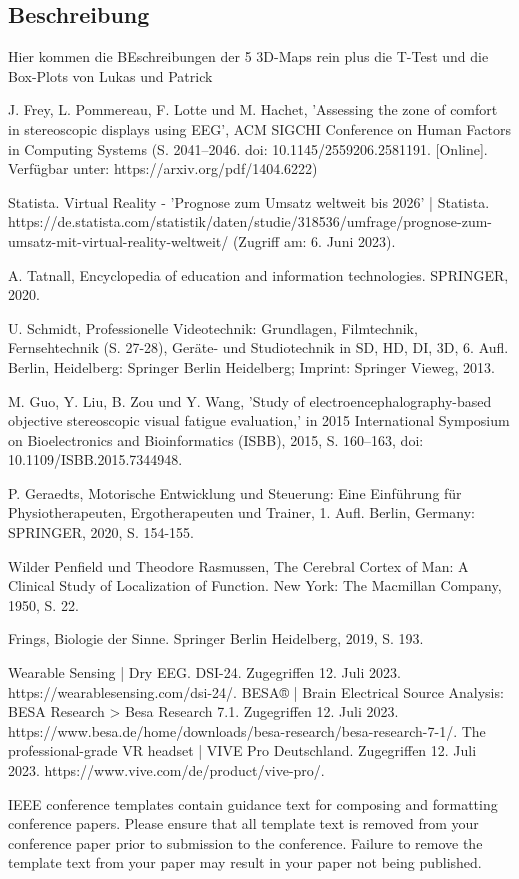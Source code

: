 \documentclass[conference]{IEEEtran}
\begin{document}
\subsection{Beschreibung}
Hier kommen die BEschreibungen der 5 3D-Maps rein plus die T-Test und die Box-Plots von Lukas und Patrick

\begin{thebibliography}{00}
 J. Frey, L. Pommereau, F. Lotte und M. Hachet, 'Assessing the zone of comfort in stereoscopic displays using EEG', ACM SIGCHI Conference on Human Factors in Computing Systems (S. 2041–2046. doi: 10.1145/2559206.2581191. [Online]. Verfügbar unter: https://arxiv.org/pdf/1404.6222)

 Statista. Virtual Reality - 'Prognose zum Umsatz weltweit bis 2026' | Statista. https://de.statista.com/statistik/daten/studie/318536/umfrage/prognose-zum-umsatz-mit-virtual-reality-weltweit/ (Zugriff am: 6. Juni 2023).

 A. Tatnall, Encyclopedia of education and information technologies. SPRINGER, 2020.

 U. Schmidt, Professionelle Videotechnik: Grundlagen, Filmtechnik, Fernsehtechnik (S. 27-28), Geräte- und Studiotechnik in SD, HD, DI, 3D, 6. Aufl. Berlin, Heidelberg: Springer Berlin Heidelberg; Imprint: Springer Vieweg, 2013.

 M. Guo, Y. Liu, B. Zou und Y. Wang, 'Study of electroencephalography-based objective stereoscopic visual fatigue evaluation,' in 2015 International Symposium on Bioelectronics and Bioinformatics (ISBB), 2015, S. 160–163, doi: 10.1109/ISBB.2015.7344948.

 P. Geraedts, Motorische Entwicklung und Steuerung: Eine Einführung für Physiotherapeuten, Ergotherapeuten und Trainer, 1. Aufl. Berlin, Germany: SPRINGER, 2020, S. 154-155.

 Wilder Penfield und Theodore Rasmussen, The Cerebral Cortex of Man: A Clinical Study of Localization of Function. New York: The Macmillan Company, 1950, S. 22.

 Frings, Biologie der Sinne. Springer Berlin Heidelberg, 2019, S. 193.

Wearable Sensing | Dry EEG. DSI-24. Zugegriffen 12. Juli 2023. https://wearablesensing.com/dsi-24/.
BESA® | Brain Electrical Source Analysis: BESA Research > Besa Research 7.1. Zugegriffen 12. Juli 2023. https://www.besa.de/home/downloads/besa-research/besa-research-7-1/.
The professional-grade VR headset | VIVE Pro Deutschland. Zugegriffen 12. Juli 2023. https://www.vive.com/de/product/vive-pro/.


\end{thebibliography}
\vspace{12pt}
\color{red}
IEEE conference templates contain guidance text for composing and formatting conference papers. Please ensure that all template text is removed from your conference paper prior to submission to the conference. Failure to remove the template text from your paper may result in your paper not being published.
\end{document}
